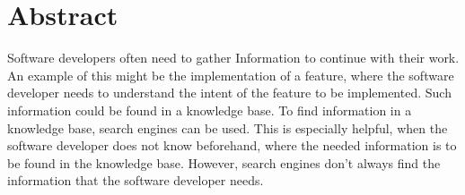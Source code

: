 %
%
%
%
%
%
%
%
\section*{Abstract}
Software developers often need to gather Information to continue with their work.
An example of this might be the implementation of a feature, where the software developer needs to understand the intent of the feature to be implemented.
Such information could be found in a knowledge base.
To find information in a knowledge base, search engines can be used.
This is especially helpful, when the software developer does not know beforehand, where the needed information is to be found in the knowledge base.
However, search engines don't always find the information that the software developer needs.\\

